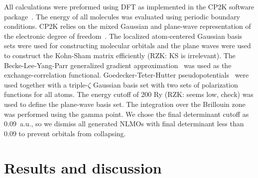 \documentclass[aps,prl,reprint,amsmath,amssymb]{revtex4-1}
\begin{document}
All calculations were preformed using DFT as implemented in the CP2K software package~\cite{cp2kgeneral}.
The energy of all molecules was evaluated using periodic boundary conditions.
CP2K relies on the mixed Gaussian and plane-wave representation of the electronic degree of freedom~\cite{hutter2014cp2k}.
The localized atom-centered Gaussian basis sets were used for constructing molecular orbitals and the plane waves were used to construct the Kohn-Sham matrix efficiently (RZK: KS is irrelevant).
The Becke-Lee-Yang-Parr generalized gradient approximation~\cite{becke1988density, lee1988development} was used as the exchange-correlation functional.
Goedecker-Teter-Hutter pseudopotentials~\cite{goedecker1996separable} were used together with a triple-$\zeta$ Gaussian basis set with two sets of polarization functions for all atoms.
The energy cutoff of 200 Ry (RZK: seems low, check) was used to define the plane-wave basis set.
The integration over the Brillouin zone was performed using the gamma point.
We chose the final determinant cutoff as 0.09~a.u., so we dismiss all generated NLMOs with final determinant less than 0.09 to prevent orbitals from collapsing.



\section{Results and discussion}
\end{document}
